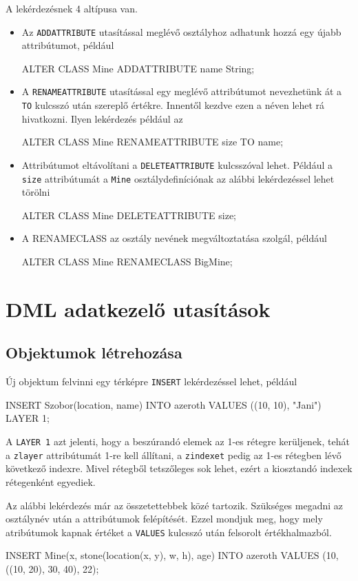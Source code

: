 A lekérdezésnek 4 altípusa van.
\begin{itemize}
\item
Az \texttt{ADDATTRIBUTE} utasítással meglévő osztályhoz adhatunk hozzá egy újabb attribútumot, például
\begin{sql}
ALTER CLASS Mine ADDATTRIBUTE name String;
\end{sql}
\item
A \texttt{RENAMEATTRIBUTE} utasítással egy meglévő attribútumot nevezhetünk át a \texttt{TO} kulcsszó után szereplő értékre. Innentől kezdve ezen a néven lehet rá hivatkozni. Ilyen lekérdezés például az
\begin{sql}
ALTER CLASS Mine RENAMEATTRIBUTE size TO name;
\end{sql}
\item
Attribútumot eltávolítani a \texttt{DELETEATTRIBUTE} kulcsszóval lehet. Például a \texttt{size} attribútumát a \texttt{Mine} osztálydefiníciónak az alábbi lekérdezéssel lehet törölni
\begin{sql}
ALTER CLASS Mine DELETEATTRIBUTE size;
\end{sql}
\item
A RENAMECLASS az osztály nevének megváltoztatása szolgál, például
\begin{sql}
ALTER CLASS Mine RENAMECLASS BigMine;
\end{sql}
\end{itemize}

\section{DML adatkezelő utasítások}

\subsection{Objektumok létrehozása}

Új objektum felvinni egy térképre \texttt{INSERT} lekérdezéssel lehet, például
\begin{sql}
INSERT Szobor(location, name) INTO azeroth
VALUES ((10, 10), "Jani") LAYER 1;
\end{sql}
A \texttt{LAYER 1} azt jelenti, hogy a beszúrandó elemek az 1-es rétegre kerüljenek, tehát a \texttt{zlayer} attribútumát 1-re kell állítani, a \texttt{zindexet} pedig az 1-es rétegben lévő következő indexre. Mivel rétegből tetszőleges sok lehet, ezért a kiosztandó indexek rétegenként egyediek.

Az alábbi lekérdezés már az összetettebbek közé tartozik. Szükséges megadni az osztálynév után a attribútumok felépítését. Ezzel mondjuk meg, hogy mely atribútumok kapnak értéket a \texttt{VALUES} kulcsszó után felsorolt értékhalmazból.
\begin{sql}
INSERT Mine(x, stone(location(x, y), w, h), age) INTO azeroth
VALUES (10, ((10, 20), 30, 40), 22);
\end{sql}

